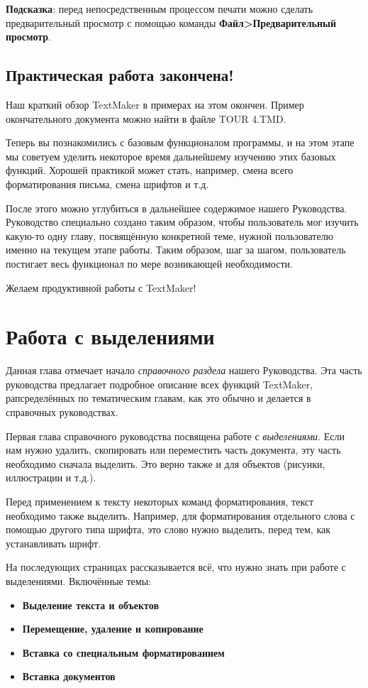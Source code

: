 \documentclass[a4paper,10pt]{article}
\begin{document}
\textbf{Подсказка}: перед непосредственным процессом печати можно сделать предварительный просмотр с помощью команды \textbf{Файл>Предварительный просмотр}.

\subsection{Практическая работа закончена!}
Наш краткий обзор TextMaker в примерах на этом окончен. Пример окончательного документа можно найти в файле TOUR 4.TMD.

Теперь вы познакомились с базовым функционалом программы, и на этом этапе мы советуем уделить некоторое время дальнейшему изучению этих базовых функций. Хорошей практикой может стать, например, смена всего форматирования письма, смена шрифтов и т.д.

После этого можно углубиться в дальнейшее содержимое нашего Руководства. Руководство специально создано таким образом, чтобы пользователь мог изучить какую-то одну главу, посвящённую конкретной теме, нужной пользователю именно на текущем этапе работы. Таким образом, шаг за шагом, пользователь постигает весь функционал по мере возникающей необходимости.

Желаем продуктивной работы с TextMaker!

\section{Работа с выделениями}
Данная глава отмечает начало \textit{справочного раздела} нашего Руководства. Эта часть руководства предлагает подробное описание всех функций TextMaker, рапсределённых по тематическим главам, как это обычно и делается в справочных руководствах. 

Первая глава справочного руководства посвящена работе с \textit{выделениями}. Если нам нужно удалить, скопировать или переместить часть документа, эту часть необходимо сначала выделить. Это верно также и для объектов (рисунки, иллюстрации и т.д.).

Перед применением к тексту некоторых команд форматирования, текст необходимо также выделить. Например, для форматирования отдельного слова с помощью другого типа шрифта, это слово нужно выделить, перед тем, как устанавливать шрифт.

На последующих страницах рассказывается всё, что нужно знать при работе с выделениями. Включённые темы:

\begin{itemize}
 \item \textbf{Выделение текста и объектов}
 \item \textbf{Перемещение, удаление и копирование}
 \item \textbf{Вставка со специальным форматированием}
 \item \textbf{Вставка документов}
\end{itemize}
\end{document}
